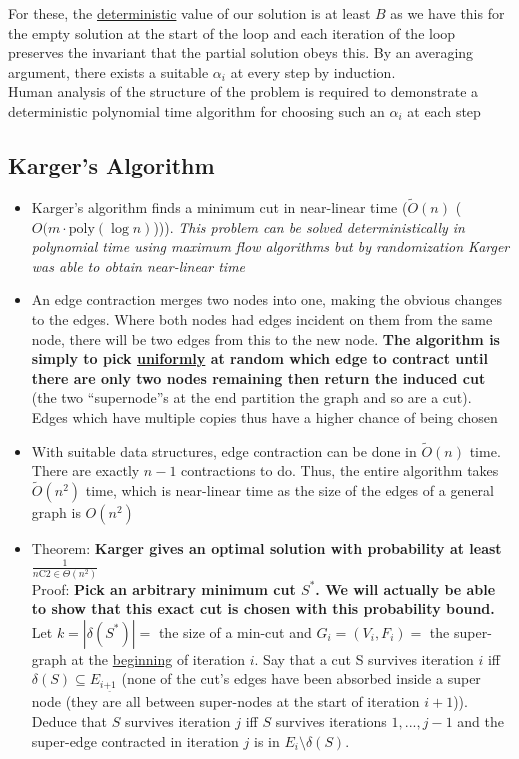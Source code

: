 \documentclass[20pt,a4paper,landscape]{extarticle}
\begin{document}
\begin{flushleft}
For these, the \underline{deterministic} value of our solution is at least $B$ as we have this for the empty solution at the start of the loop and each iteration of the loop preserves the invariant that the partial solution obeys this. By an averaging argument, there exists a suitable $\alpha_i$ at every step by induction.\\
Human analysis of the structure of the problem is required to demonstrate a deterministic polynomial time algorithm for choosing such an $\alpha_i$ at each step
\subsection{Karger's Algorithm}
\begin{itemize}
\item Karger's algorithm finds a minimum cut in near-linear time ($\widetilde{O}(n)$ ($O(m\cdot\text{poly}(\log n)$))). \textit{This problem can be solved deterministically in polynomial time using maximum flow algorithms but by randomization Karger was able to obtain near-linear time}
\item An edge contraction merges two nodes into one, making the obvious changes to the edges. Where both nodes had edges incident on them from the same node, there will be two edges from this to the new node. \textbf{The algorithm is simply to pick \underline{uniformly} at random which edge to contract until there are only two nodes remaining then return the induced cut} (the two ``supernode''s at the end partition the graph and so are a cut). Edges which have multiple copies thus have a higher chance of being chosen
\item With suitable data structures, edge contraction can be done in $\widetilde{O}(n)$ time. There are exactly $n-1$ contractions to do. Thus, the entire algorithm takes $\widetilde{O}(n^2)$  time, which is near-linear time as the size of the edges of a general graph is $O(n^2)$
\item Theorem: \textbf{Karger gives an optimal solution with probability at least $\frac{1}{n\textrm{C}2 \in \Theta(n^2)}$}\\
Proof: \textbf{Pick an arbitrary minimum cut $S^\ast$. We will actually be able to show that this exact cut is chosen with this probability bound.}\\
Let $k = |\delta(S^\ast)| =$ the size of a min-cut and $G_i = (V_i, F_i) =$ the super-graph at the \underline{beginning} of iteration $i$. Say that a cut S survives iteration $i$ iff $\delta(S) \subseteq E_{i\underline{+1}}$ (none of the cut's edges have been absorbed inside a super node (they are all between super-nodes at the start of iteration $i+1$)). Deduce that $S$ survives iteration $j$ iff $S$ survives iterations $1, ..., j-1$ and the super-edge contracted in iteration $j$ is in $E_i \setminus \delta(S)$.\\

\end{itemize}
\end{flushleft}
\end{document}
